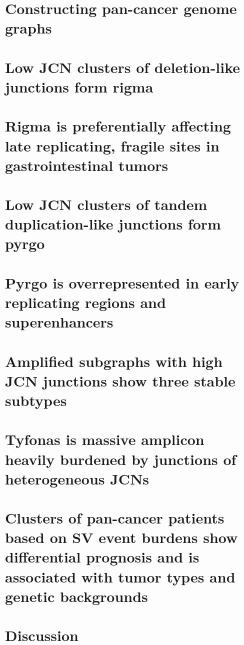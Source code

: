 \documentclass[phd,tocprelim]{cornell}
\begin{document}
\section{Constructing pan-cancer genome graphs}

\section{Low JCN clusters of deletion-like junctions form rigma}

\section{Rigma is preferentially affecting late replicating, fragile sites in gastrointestinal tumors}

\section{Low JCN clusters of tandem duplication-like junctions form pyrgo}

\section{Pyrgo is overrepresented in early replicating regions and superenhancers}

\section{Amplified subgraphs with high JCN junctions show three stable subtypes}

\section{Tyfonas is massive amplicon heavily burdened by junctions of heterogeneous JCNs}

\section{Clusters of pan-cancer patients based on SV event burdens show differential prognosis and is associated with tumor types and genetic backgrounds}

\section{Discussion}


\end{document}

